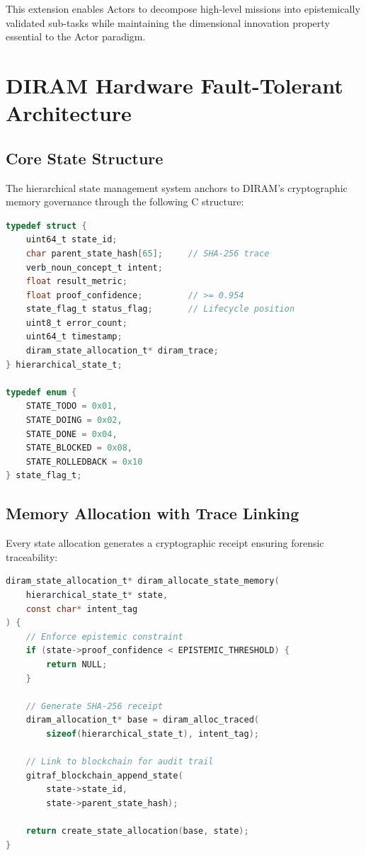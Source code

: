 \documentclass[11pt,conference]{IEEEtran}
\theoremstyle{definition}
\begin{document}
This extension enables Actors to decompose high-level missions into epistemically validated sub-tasks while maintaining the dimensional innovation property essential to the Actor paradigm.

\section{DIRAM Hardware Fault-Tolerant Architecture}

\subsection{Core State Structure}

The hierarchical state management system anchors to DIRAM's cryptographic memory governance through the following C structure:

\begin{lstlisting}[language=C,caption={DIRAM-backed hierarchical state structure}]
typedef struct {
    uint64_t state_id;
    char parent_state_hash[65];     // SHA-256 trace
    verb_noun_concept_t intent;
    float result_metric;
    float proof_confidence;         // >= 0.954
    state_flag_t status_flag;       // Lifecycle position
    uint8_t error_count;
    uint64_t timestamp;
    diram_state_allocation_t* diram_trace;
} hierarchical_state_t;

typedef enum {
    STATE_TODO = 0x01,
    STATE_DOING = 0x02,
    STATE_DONE = 0x04,
    STATE_BLOCKED = 0x08,
    STATE_ROLLEDBACK = 0x10
} state_flag_t;
\end{lstlisting}

\subsection{Memory Allocation with Trace Linking}

Every state allocation generates a cryptographic receipt ensuring forensic traceability:

\begin{lstlisting}[language=C,caption={DIRAM state allocation implementation}]
diram_state_allocation_t* diram_allocate_state_memory(
    hierarchical_state_t* state,
    const char* intent_tag
) {
    // Enforce epistemic constraint
    if (state->proof_confidence < EPISTEMIC_THRESHOLD) {
        return NULL;
    }
    
    // Generate SHA-256 receipt
    diram_allocation_t* base = diram_alloc_traced(
        sizeof(hierarchical_state_t), intent_tag);
    
    // Link to blockchain for audit trail
    gitraf_blockchain_append_state(
        state->state_id,
        state->parent_state_hash);
    
    return create_state_allocation(base, state);
}
\end{lstlisting}
\end{document}
